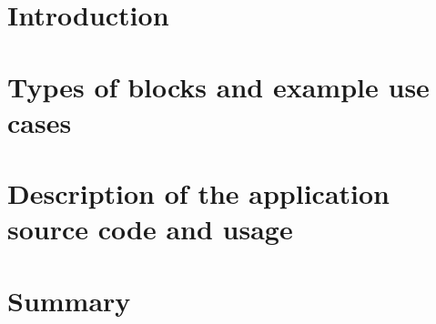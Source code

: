 \documentclass[12pt,a4paper]{report}
\begin{document}

\tableofcontents
\listoffigures

\chapter{Introduction}


\chapter{Types of blocks and example use cases}


\chapter{Description of the application source code and usage}


\chapter{Summary}

\end{document}
